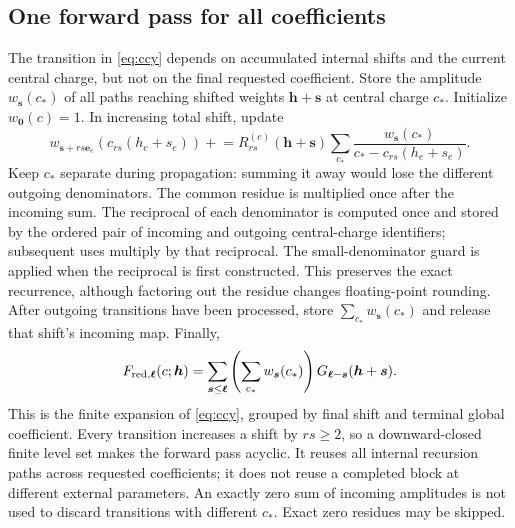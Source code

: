 \documentclass[11pt]{article}
\numberwithin{equation}{section}
\begin{document}
\subsection{One forward pass for all coefficients}
The transition in \eqref{eq:ccy} depends on accumulated internal shifts and
the current central charge, but not on the final requested coefficient.
Store the amplitude $w_{\boldsymbol s}(c_*)$ of all paths reaching shifted
weights $\boldsymbol h+\boldsymbol s$ at central charge $c_*$.
Initialize $w_{\boldsymbol0}(c)=1$. In increasing total shift, update
\begin{equation}
 w_{\boldsymbol s+rs\boldsymbol e_e}(c_{rs}(h_e+s_e))\mathrel{+}=
 R_{rs}^{(e)}(\boldsymbol h+\boldsymbol s)
 \sum_{c_*}\frac{w_{\boldsymbol s}(c_*)}{c_*-c_{rs}(h_e+s_e)}.
 \label{eq:forward}
\end{equation}
Keep $c_*$ separate during propagation: summing it away would lose the
different outgoing denominators. The common residue is multiplied once after
the incoming sum. The reciprocal of each denominator is computed once and
stored by the ordered pair of incoming and outgoing central-charge identifiers;
subsequent uses multiply by that reciprocal. The small-denominator guard is
applied when the reciprocal is first constructed. This preserves the exact
recurrence, although factoring out the residue changes floating-point rounding.
After outgoing transitions have been processed,
store $\sum_{c_*}w_{\boldsymbol s}(c_*)$ and release that shift's incoming map.
Finally,
\begin{equation}
 F_{{\rm red},\boldsymbol\ell}(c;\boldsymbol h)
 =\sum_{\boldsymbol s\le\boldsymbol\ell}
       \left(\sum_{c_*}w_{\boldsymbol s}(c_*)\right)
       G_{\boldsymbol\ell-\boldsymbol s}(\boldsymbol h+\boldsymbol s).
 \label{eq:forward-assemble}
\end{equation}
This is the finite expansion of \eqref{eq:ccy}, grouped by final shift and
terminal global coefficient. Every transition increases a shift by $rs\ge2$,
so a downward-closed finite level set makes the forward pass acyclic.
It reuses all internal recursion paths across requested coefficients;
it does not reuse a completed block at different external parameters.
An exactly zero sum of incoming amplitudes is not used to discard transitions
with different $c_*$. Exact zero residues may be skipped.
\end{document}

